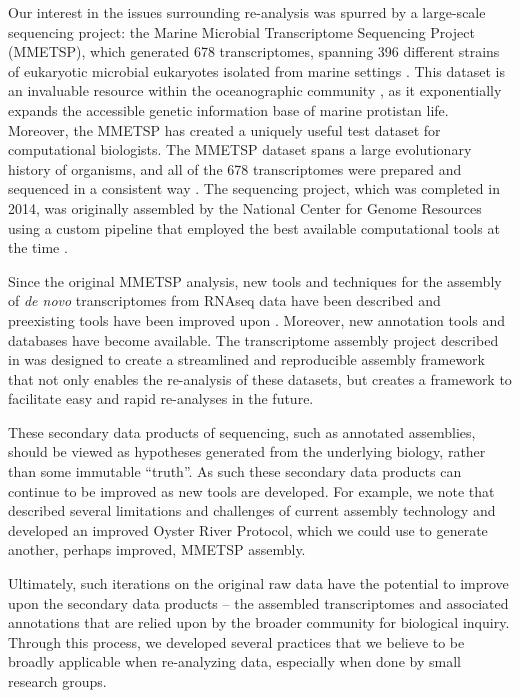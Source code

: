 \documentclass[a4paper,num-refs]{oup-contemporary}
\begin{document}

Our interest in the issues surrounding re-analysis was spurred by a large-scale sequencing project: the Marine Microbial Transcriptome Sequencing Project (MMETSP), which generated 678 transcriptomes, spanning 396 different strains of eukaryotic microbial eukaryotes isolated from marine settings \cite{Caron2016}. This dataset is an invaluable resource within the oceanographic community \cite{Keeling2014, Caron2016}, as it exponentially expands the accessible genetic information base of marine protistan life. Moreover, the MMETSP has created a uniquely useful test dataset for computational biologists. The MMETSP dataset spans a large evolutionary history of organisms, and all of the 678 transcriptomes were prepared and sequenced in a consistent way \cite{Keeling2014}. The sequencing project, which was completed in 2014, was originally assembled by the National Center for Genome Resources using a custom pipeline that employed the best available computational tools at the time \cite{Simpson2009, Huang1999}.

Since the original MMETSP analysis, new tools and techniques for the assembly of {\em de novo} transcriptomes from RNAseq data have been described and preexisting tools have been improved upon \cite{Grabherr2011}. Moreover, new annotation tools and databases have become available. The transcriptome assembly project described in \citet{Johnson2018} was designed to create a streamlined and reproducible assembly framework that not only enables the re-analysis of these datasets, but creates a framework to facilitate easy and rapid re-analyses in the future.

These secondary data products of sequencing, such as annotated
assemblies, should be viewed as hypotheses generated from the
underlying biology, rather than some immutable ``truth''. As such these
secondary data products can continue to be improved as new tools are
developed.  For example, we note that \citet{MacManes177253} described several
limitations and challenges of current assembly technology and developed
an improved Oyster River Protocol, which we could use to generate another,
perhaps improved, MMETSP assembly.

Ultimately, such iterations on the original raw data have the
potential to improve upon the secondary data products -- the assembled
transcriptomes and associated annotations that are relied upon by the
broader community for biological inquiry. Through this process, we developed several
practices that we believe to be broadly applicable when re-analyzing data,
especially when done by small research groups.
\end{document}
